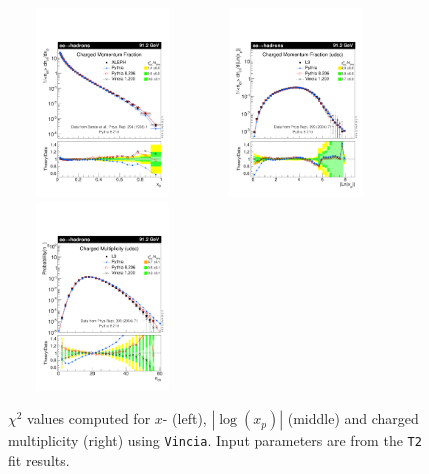 \documentclass[aps,preprint,floatfix,nofootinbib,showpacs]{revtex4-1}
\begin{document}
  \begin{figure}[!h]
 \centering
 \includegraphics[width=5cm, height=5cm]{Vincia-T2/vincia03-x.pdf}
 \hfill
 \includegraphics[width=5cm, height=5cm]{Vincia-T2/vincia03-Lnx.pdf}
 \hfill
 \includegraphics[width=5cm, height=5cm]{Vincia-T2/vincia03-Nch.pdf}
 \caption{$\chi^2$ values computed for $x$- (left), $|\log(x_p)|$ (middle) and charged multiplicity (right) using
 \texttt{Vincia}. Input parameters are from the \texttt{T2} fit results.}
 \label{Chi2-2}
 \end{figure}
 
\end{document}
